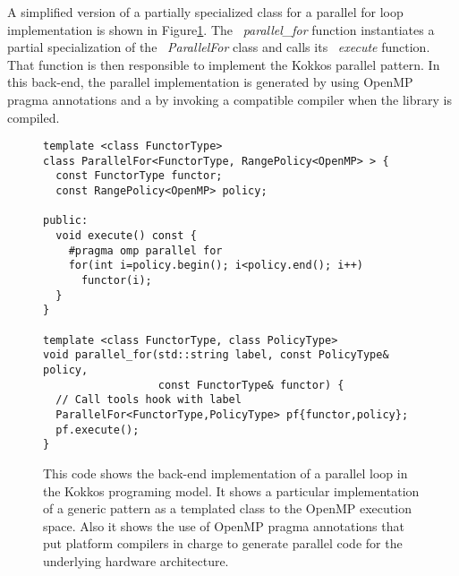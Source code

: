 A simplified version of a partially specialized class for a parallel for loop implementation is shown in Figure\ref{fig:KokkosExampleOMPBackEnd}. The ~\emph{parallel\_for} function instantiates a partial specialization of the ~\emph{ParallelFor} class and calls its ~\emph{execute} function. That function is then responsible to implement the Kokkos parallel pattern. In this back-end, the parallel implementation is generated by using OpenMP pragma annotations and a by invoking a compatible compiler when the library is compiled. 
\begin{figure}
\begin{small}
\begin{Verbatim}[frame=leftline]
template <class FunctorType>
class ParallelFor<FunctorType, RangePolicy<OpenMP> > {
  const FunctorType functor;
  const RangePolicy<OpenMP> policy; 

public:
  void execute() const {
    #pragma omp parallel for
    for(int i=policy.begin(); i<policy.end(); i++)
      functor(i);
  }
}

template <class FunctorType, class PolicyType>
void parallel_for(std::string label, const PolicyType& policy,
                  const FunctorType& functor) {
  // Call tools hook with label
  ParallelFor<FunctorType,PolicyType> pf{functor,policy};
  pf.execute();
}

\end{Verbatim}
\end{small}
\caption{This code shows the back-end implementation of a parallel loop in the Kokkos programing model. It shows a particular implementation of a generic pattern as a templated class to the OpenMP execution space. Also it shows the use of OpenMP pragma annotations that put platform compilers in charge to generate parallel code for the underlying hardware architecture.}
\label{fig:KokkosExampleOMPBackEnd}
\end{figure}


